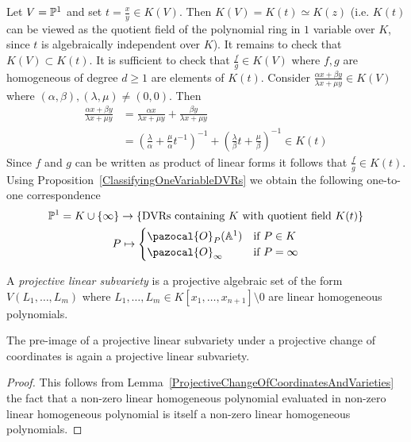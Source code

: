     \begin{example}
        Let $V = \mathbb{P}^1$ and set $t = \frac{x}{y}\in K(V)$. Then $K(V)=K(t)\simeq K(z)$ (i.e. $K(t)$ can be viewed as the quotient field of the polynomial ring in $1$ variable over $K$, since $t$ is algebraically independent over $K$). It remains to check that $K(V)\subset K(t)$. It is sufficient to check that $\frac{f}{g}\in K(V)$ where $f,g$ are homogeneous of degree $d\geq 1$ are elements of $K(t)$. Consider $\frac{\alpha x+\beta y}{\lambda x+\mu y}\in K(V)$ where $(\alpha,\beta),(\lambda,\mu)\neq (0,0)$. Then 
        \begin{align*}
            \frac{\alpha x+\beta y}{\lambda x+\mu y} &= \frac{\alpha x}{\lambda x + \mu y} + \frac{\beta y}{\lambda x + \mu y} \\
            &= \left(\frac{\lambda}{\alpha} + \frac{\mu }{\alpha }t^{-1} \right)^{-1} + \left(\frac{\lambda}{\beta}t+\frac{\mu}{\beta} \right)^{-1} \in K(t)  
        \end{align*}
        Since $f$ and $g$ can be written as product of linear forms it follows that $\frac{f}{g}\in K(t)$. Using Proposition~\ref{ClassifyingOneVariableDVRs} we obtain the following one-to-one correspondence 
        \begin{gather*}
            \Pp^1=K\cup \{\infty\} \rightarrow \{\text{DVRs containing } K \text{ with quotient field } K(t)\}\\
            P \mapsto 
            \begin{cases}
                \pazocal{O}_P(\A^1) & \text{if } P\in K\\
                \pazocal{O}_\infty & \text{if } P = \infty
            \end{cases} 
        \end{gather*}
    \end{example}
    \begin{definition}
        A \textit{projective linear subvariety} is a projective algebraic set of the form $V(L_1,\dots,L_m)$ where $L_1,\dots,L_m\in K[x_1,\dots,x_{n+1}]\setminus 0$ are linear homogeneous polynomials. 
    \end{definition}
    \begin{lemma}
        The pre-image of a projective linear subvariety under a projective change of coordinates is again a projective linear subvariety. 
    \end{lemma}
    \begin{proof}
        This follows from Lemma~\ref{ProjectiveChangeOfCoordinatesAndVarieties} the fact that a non-zero linear homogeneous polynomial evaluated in non-zero linear homogeneous polynomial is itself a non-zero linear homogeneous polynomials. 
    \end{proof}
